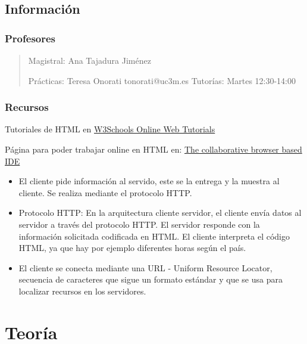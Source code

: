\documentclass[12pt, twoside, openright]{report} %
\begin{document}
\listoffigures
\thispagestyle{fancy}





\chapter{Información}
\section{Profesores}
\begin{quote}
Magistral: Ana Tajadura Jiménez

Prácticas: Teresa Onorati tonorati@uc3m.es Tutorías: Martes 12:30-14:00
\end{quote}

\section{Recursos}

Tutoriales de HTML en \href{https://www.w3schools.com/}{W3Schools Online Web Tutorials}

Página para poder trabajar online en HTML en: \href{https://repl.it/}{The collaborative browser based IDE}

\begin{itemize}

\item
  El cliente pide información al servido, este se la entrega y la
  muestra al cliente. Se realiza mediante el protocolo HTTP.
\item
  Protocolo HTTP: En la arquitectura cliente servidor, el cliente envía
  datos al servidor a través del protocolo HTTP. El servidor responde
  con la información solicitada codificada en HTML. El cliente
  interpreta el código HTML, ya que hay por ejemplo diferentes horas
  según el país.
\item
  El cliente se conecta mediante una URL - Uniform Resource Locator,
  secuencia de caracteres que sigue un formato estándar y que se usa
  para localizar recursos en los servidores.
\end{itemize}

\part{Teoría}
\end{document}
